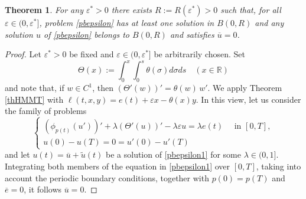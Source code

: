 \documentclass[11pt]{amsart}
\newtheorem{theorem}{Theorem}[section]
\numberwithin{equation}{section} \textwidth=15.5cm
\begin{document}
\begin{theorem}\label{thepsilon}
For any $\varepsilon^*>0$ there exists $R:=R(\varepsilon^*)>0$ such that, for all $\varepsilon\in(0,\varepsilon^*]$, problem \eqref{pbepsilon} has at least one solution in $B(0,R)$ and any solution $u$ of \eqref{pbepsilon} belongs to $B(0,R)$ and satisfies $\overline{u}=0$.
\end{theorem}

\noindent\begin{proof} Let $\varepsilon^*>0$ be fixed and $\varepsilon\in(0,\varepsilon^*]$ be arbitrarily chosen. Set $$\Theta(x):=\int_0^x\int_0^s\theta(\sigma)d\sigma ds\quad (x\in \mathbb R)$$ and note that, if $w\in C^1$, then $(\Theta'(w))'=\theta(w)\, w'$. We apply Theorem \ref{thHMMT} with $\ell(t,x,y)=e(t)+\varepsilon x-\theta(x)y$. In this view, let us consider the family of problems
\begin{equation}\label{pbepsilon1}
	\left \{
            \begin{array}{ll}
		      (\phi_{p(t)}(u'))'+\lambda(\Theta'(u))'-\lambda\varepsilon u=\lambda e(t)\quad \mbox{ in }[0,T],\\
		      u(0)-u(T)=0=u'(0)-u'(T)
			\end{array}
\right.
\end{equation}
and let $u(t)=\overline{u}+\tilde{u}(t)$ be a solution of \eqref{pbepsilon1} for some $\lambda\in(0,1]$. Integrating
both members of the equation in \eqref{pbepsilon1} over $[0,T]$, taking into account the periodic boundary conditions, together with $p(0)=p(T)$ and $\overline{e}=0$, it follows $\overline{u}=0$.


\end{proof}
\end{document}
